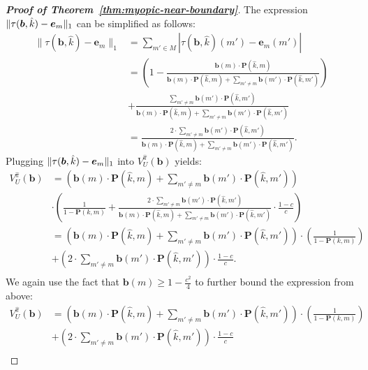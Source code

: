 \begin{proof}[\normalfont\bfseries Proof of Theorem~\ref{thm:myopic-near-boundary}]
    The expression $\lVert\tau(\bm{b}, \hat{k}) - \bm e_m\rVert_1$ can be simplified as follows:
    \begin{align*}
       \|\tau(\mathbf{b}, \hat{k}) - \mathbf{e}_m\|_1 
       &= \sum_{m' \in M} |\tau(\mathbf{b}, \hat{k})(m') - \mathbf{e}_m(m')| \\
       &= \left( 1 - \frac{\mathbf{b}(m) \cdot \mathbf{P}(\hat{k}, m)}{\mathbf{b}(m) \cdot \mathbf{P}(\hat{k}, m) + \sum_{m' \neq m} \mathbf{b}(m') \cdot \mathbf{P}(\hat{k}, m')} \right) \\
       &+ \frac{\sum_{m' \neq m} \mathbf{b}(m') \cdot \mathbf{P}(\hat{k}, m')}{\mathbf{b}(m) \cdot \mathbf{P}(\hat{k}, m) + \sum_{m' \neq m} \mathbf{b}(m') \cdot \mathbf{P}(\hat{k}, m')} \\
       &= \frac{2 \cdot \sum_{m' \neq m} \mathbf{b}(m') \cdot \mathbf{P}(\hat{k}, m')}{\mathbf{b}(m) \cdot \mathbf{P}(\hat{k}, m) + \sum_{m' \neq m} \mathbf{b}(m') \cdot \mathbf{P}(\hat{k}, m')}.
    \end{align*}
    Plugging $\lVert\tau(\bm{b}, \hat{k}) - \bm e_m\rVert_1$ into $V^{\hat{\pi}}_{U}(\bm{b})$ yields:
    \begin{align*}
         V^{\hat{\pi}}_{U}(\bm{b}) &= \left( \bm b(m) \cdot \bm{P}(\hat{k}, m) + \sum_{m' \neq m} \bm b(m') \cdot \bm{P}(\hat{k}, m') \right) \\
         &\cdot \left( \frac{1}{1 - \bm{P}(k, m)} + \frac{2 \cdot \sum_{m' \neq m} \bm b(m') \cdot \bm{P}(\hat{k}, m')}{\bm b(m) \cdot \bm{P}(\hat{k}, m) + \sum_{m' \neq m} \bm b(m') \cdot \bm{P}(\hat{k}, m')} \cdot \frac{1-c}{c} \right) \\
         &= \left( \bm b(m) \cdot \bm{P}(\hat{k}, m) + \sum_{m' \neq m} \bm b(m') \cdot \bm{P}(\hat{k}, m') \right) \cdot \left( \frac{1}{1 - \bm{P}(k, m)} \right) \\
         &+ \left( 2 \cdot \sum_{m' \neq m} \bm b(m') \cdot \bm{P}(\hat{k}, m') \right) \cdot \frac{1-c}{c}. \\ 
    \end{align*}
    We again use the fact that $\bm b(m) \geq 1 - \frac{c^2}{4}$ to further bound the expression from above:
    \begin{align*}
        V^{\hat{\pi}}_{U}(\bm{b}) &= \left( \bm b(m) \cdot \bm{P}(\hat{k}, m) + \sum_{m' \neq m} \bm b(m') \cdot \bm{P}(\hat{k}, m') \right) \cdot \left( \frac{1}{1 - \bm{P}(k, m)} \right) \\
        &+ \left( 2 \cdot \sum_{m' \neq m} \bm b(m') \cdot \bm{P}(\hat{k}, m') \right) \cdot \frac{1-c}{c} \\

\end{align*}
\end{proof}
